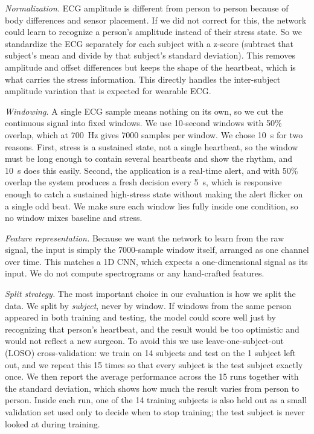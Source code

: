 \documentclass[conference]{IEEEtran}
\begin{document}
\textit{Normalization.} ECG amplitude is different from person to person because
of body differences and sensor placement. If we did not correct for this, the
network could learn to recognize a person's amplitude instead of their stress
state. So we standardize the ECG separately for each subject with a z-score
(subtract that subject's mean and divide by that subject's standard deviation).
This removes amplitude and offset differences but keeps the shape of the
heartbeat, which is what carries the stress information. This directly handles
the inter-subject amplitude variation that is expected for wearable ECG.

\textit{Windowing.} A single ECG sample means nothing on its own, so we cut the
continuous signal into fixed windows. We use 10-second windows with 50\% overlap,
which at 700~Hz gives 7000 samples per window. We chose 10~s for two reasons.
First, stress is a sustained state, not a single heartbeat, so the window must be
long enough to contain several heartbeats and show the rhythm, and 10~s does this
easily. Second, the application is a real-time alert, and with 50\% overlap the
system produces a fresh decision every 5~s, which is responsive enough to catch a
sustained high-stress state without making the alert flicker on a single odd
beat. We make sure each window lies fully inside one condition, so no window
mixes baseline and stress.

\textit{Feature representation.} Because we want the network to learn from the
raw signal, the input is simply the 7000-sample window itself, arranged as one
channel over time. This matches a 1D CNN, which expects a one-dimensional signal
as its input. We do not compute spectrograms or any hand-crafted features.

\textit{Split strategy.} The most important choice in our evaluation is how we
split the data. We split by \textit{subject}, never by window. If windows from
the same person appeared in both training and testing, the model could score well
just by recognizing that person's heartbeat, and the result would be too
optimistic and would not reflect a new surgeon. To avoid this we use
leave-one-subject-out (LOSO) cross-validation: we train on 14 subjects and test on
the 1 subject left out, and we repeat this 15 times so that every subject is the
test subject exactly once. We then report the average performance across the 15
runs together with the standard deviation, which shows how much the result varies
from person to person. Inside each run, one of the 14 training subjects is also
held out as a small validation set used only to decide when to stop training; the
test subject is never looked at during training.
\end{document}
